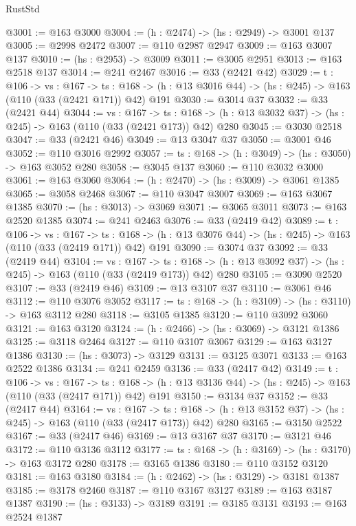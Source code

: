 \begin{lexlean}{RustStd}
\begin{coremodule}
@3001 := @163 @3000
@3004 := (h : @2474) -> (hs : @2949) -> @3001 @137
@3005 := @2998 @2472
@3007 := @110 @2987 @2947
@3009 := @163 @3007 @137
@3010 := (hs : @2953) -> @3009
@3011 := @3005 @2951
@3013 := @163 @2518 @137
@3014 := @241 @2467
@3016 := @33 (@2421 @42)
@3029 := {t : @106} ->
  {vs : @167} ->
  {ts : @168} -> (h : @13 @3016 @44) -> (hs : @245) -> @163 (@110 (@33 (@2421 @171)) @42) @191
@3030 := @3014 @37
@3032 := @33 (@2421 @44)
@3044 := {vs : @167} ->
  {ts : @168} -> (h : @13 @3032 @37) -> (hs : @245) -> @163 (@110 (@33 (@2421 @173)) @42) @280
@3045 := @3030 @2518
@3047 := @33 (@2421 @46)
@3049 := @13 @3047 @37
@3050 := @3001 @46
@3052 := @110 @3016 @2992
@3057 := {ts : @168} -> (h : @3049) -> (hs : @3050) -> @163 @3052 @280
@3058 := @3045 @137
@3060 := @110 @3032 @3000
@3061 := @163 @3060
@3064 := (h : @2470) -> (hs : @3009) -> @3061 @1385
@3065 := @3058 @2468
@3067 := @110 @3047 @3007
@3069 := @163 @3067 @1385
@3070 := (hs : @3013) -> @3069
@3071 := @3065 @3011
@3073 := @163 @2520 @1385
@3074 := @241 @2463
@3076 := @33 (@2419 @42)
@3089 := {t : @106} ->
  {vs : @167} ->
  {ts : @168} -> (h : @13 @3076 @44) -> (hs : @245) -> @163 (@110 (@33 (@2419 @171)) @42) @191
@3090 := @3074 @37
@3092 := @33 (@2419 @44)
@3104 := {vs : @167} ->
  {ts : @168} -> (h : @13 @3092 @37) -> (hs : @245) -> @163 (@110 (@33 (@2419 @173)) @42) @280
@3105 := @3090 @2520
@3107 := @33 (@2419 @46)
@3109 := @13 @3107 @37
@3110 := @3061 @46
@3112 := @110 @3076 @3052
@3117 := {ts : @168} -> (h : @3109) -> (hs : @3110) -> @163 @3112 @280
@3118 := @3105 @1385
@3120 := @110 @3092 @3060
@3121 := @163 @3120
@3124 := (h : @2466) -> (hs : @3069) -> @3121 @1386
@3125 := @3118 @2464
@3127 := @110 @3107 @3067
@3129 := @163 @3127 @1386
@3130 := (hs : @3073) -> @3129
@3131 := @3125 @3071
@3133 := @163 @2522 @1386
@3134 := @241 @2459
@3136 := @33 (@2417 @42)
@3149 := {t : @106} ->
  {vs : @167} ->
  {ts : @168} -> (h : @13 @3136 @44) -> (hs : @245) -> @163 (@110 (@33 (@2417 @171)) @42) @191
@3150 := @3134 @37
@3152 := @33 (@2417 @44)
@3164 := {vs : @167} ->
  {ts : @168} -> (h : @13 @3152 @37) -> (hs : @245) -> @163 (@110 (@33 (@2417 @173)) @42) @280
@3165 := @3150 @2522
@3167 := @33 (@2417 @46)
@3169 := @13 @3167 @37
@3170 := @3121 @46
@3172 := @110 @3136 @3112
@3177 := {ts : @168} -> (h : @3169) -> (hs : @3170) -> @163 @3172 @280
@3178 := @3165 @1386
@3180 := @110 @3152 @3120
@3181 := @163 @3180
@3184 := (h : @2462) -> (hs : @3129) -> @3181 @1387
@3185 := @3178 @2460
@3187 := @110 @3167 @3127
@3189 := @163 @3187 @1387
@3190 := (hs : @3133) -> @3189
@3191 := @3185 @3131
@3193 := @163 @2524 @1387

\end{coremodule}
\end{lexlean}
